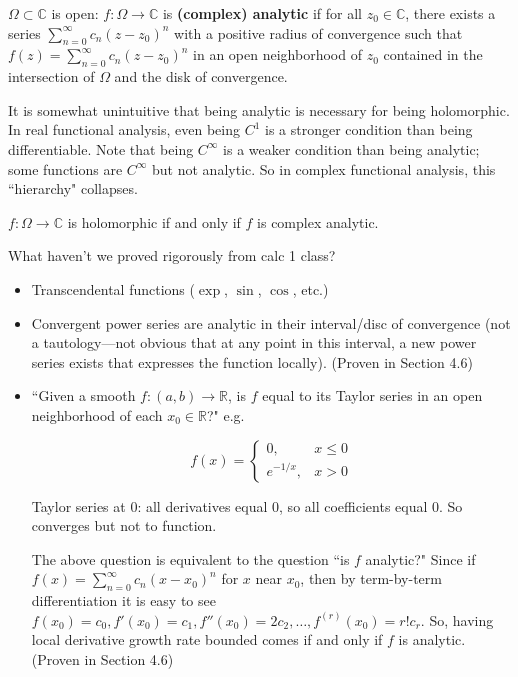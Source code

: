 \begin{definition}

\(\Omega \subset \mathbb{C}\) is open: \(f: \Omega \to \mathbb{C}\) is \textbf{(complex) analytic} if for all \(z_0 \in \mathbb{C}\), there exists a series \(\sum_{n=0}^\infty c_n(z - z_0)^n\) with a positive radius of convergence such that \(f(z) = \sum_{n=0}^\infty c_n(z - z_0)^n\) in an open neighborhood of \(z_0\) contained in the intersection of \(\Omega\) and the disk of convergence.

\end{definition}

\begin{remark}

It is somewhat unintuitive that being analytic is necessary for being holomorphic. In real functional analysis, even being \(C^1\) is a stronger condition than being differentiable. Note that being \(C^\infty\) is a weaker condition than being analytic; some functions are \(C^\infty\) but not analytic. So in complex functional analysis, this ``hierarchy" collapses.

\end{remark}

\begin{theorem}

\(f: \Omega \to \mathbb{C}\) is holomorphic if and only if \(f\) is complex analytic.

\end{theorem}

What haven't we proved rigorously from calc 1 class? 

\begin{itemize}

\item Transcendental functions (\(\exp\), \(\sin\), \(\cos\), etc.) 

\item Convergent power series are analytic in their interval/disc of convergence (not a tautology---not obvious that at any point in this interval, a new power series exists that expresses the function locally). (Proven in Section 4.6)

\item ``Given a smooth \(f:(a,b) \to \mathbb{R}\), is \(f\) equal to its Taylor series in an open neighborhood of each \(x_0 \in \mathbb{R}\)?" e.g. 

\[
f(x) = \begin{cases}
0, & x \leq 0 \\
e^{-1/x}, & x > 0
\end{cases}
\]

Taylor series at 0: all derivatives equal 0, so all coefficients equal 0. So converges but not to function.

The above question is equivalent to the question ``is \(f\) analytic?" Since if \(f(x) = \sum_{n=0}^\infty c_n(x - x_0)^n\) for \(x\) near \(x_0\), then by term-by-term differentiation it is easy to see \(f(x_0) = c_0, f'(x_0) = c_1, f''(x_0) =2 c_2, \ldots, f^{(r)}(x_0) = r! c_r\). So, having local derivative growth rate bounded comes if and only if \(f\) is analytic. (Proven in Section 4.6)

\end{itemize}

